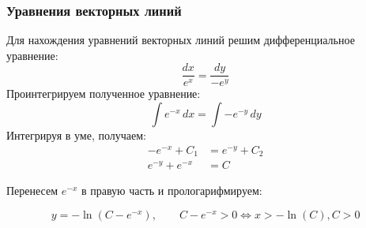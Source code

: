 \begin{frame}\frametitle{Уравнения векторных линий}

	Для нахождения уравнений векторных линий решим дифференциальное уравнение:
	\begin{equation}
		\frac{dx}{e^x} = \frac{dy}{-e^y}
		\label{eq:vec_lines}
	\end{equation}
	Проинтегрируем полученное уравнение:
	\begin{equation}
		\int e^{-x} \, dx = \int -e^{-y} \, dy
		\label{eq:vec_lines_int}
	\end{equation}
	Интегрируя в уме, получаем:
	\begin{align*}
		-e^{-x} + C_1    & = e^{-y} + C_2 \\
		e^{-y}  + e^{-x} & = C
		\label{eq:vec_lines_integrated}
	\end{align*}

	Перенесем \(e^{-x}\) в правую часть и прологарифмируем:

	\begin{equation}
		y = - \ln(C - e^{-x}), \qquad
		C - e^{-x} > 0 \Longleftrightarrow x > - \ln(C), C > 0
		\label{eq:vec_lines_final}
	\end{equation}

\end{frame}
